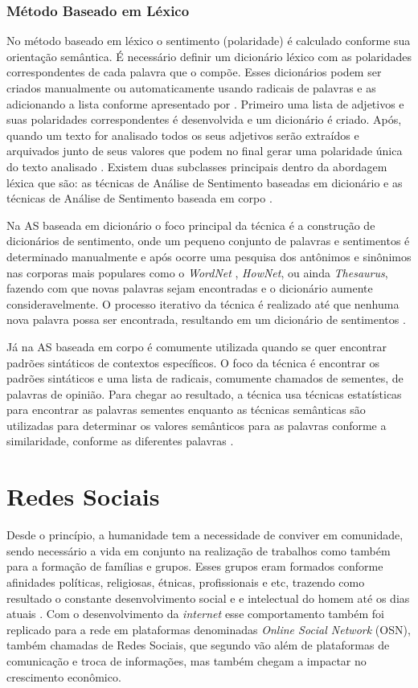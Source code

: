 \subsubsection{Método Baseado em Léxico}
\label{subsubsec:lexico}
No método baseado em léxico o sentimento (polaridade) é calculado conforme sua orientação semântica. É necessário definir um dicionário léxico com as polaridades correspondentes de cada palavra que o compõe. Esses dicionários podem ser criados manualmente ou automaticamente usando radicais de palavras e as adicionando a lista conforme apresentado por . Primeiro uma lista de adjetivos e suas polaridades correspondentes é desenvolvida e um dicionário é criado. Após, quando um texto for analisado todos os seus adjetivos serão extraídos e arquivados junto de seus valores que podem no final gerar uma polaridade única do texto analisado \cite{Taboada}. Existem duas subclasses principais dentro da abordagem léxica que são: as técnicas de Análise de Sentimento baseadas em dicionário e as técnicas de Análise de Sentimento baseada em corpo \cite{LIU2017149}.

Na AS baseada em dicionário o foco principal da técnica é a construção de dicionários de sentimento, onde um pequeno conjunto de palavras e sentimentos é determinado manualmente e após ocorre uma pesquisa dos antônimos e sinônimos nas corporas mais populares como o \textit{WordNet} \cite{Miller:1995:WLD:219717.219748}, \textit{HowNet}, ou ainda \textit{Thesaurus}, fazendo com que novas palavras sejam encontradas e o dicionário aumente consideravelmente. O processo iterativo da técnica é realizado até que nenhuma nova palavra possa ser encontrada, resultando em um dicionário de sentimentos \cite{LIU2017149}. 

Já na AS baseada em corpo é comumente utilizada quando se quer encontrar padrões sintáticos de contextos específicos. O foco da técnica é encontrar os padrões sintáticos e uma lista de radicais, comumente chamados de sementes, de palavras de opinião. Para chegar ao resultado, a técnica usa técnicas estatísticas para encontrar as palavras sementes enquanto as técnicas semânticas são utilizadas para determinar os valores semânticos para as palavras conforme a similaridade, conforme as diferentes palavras \cite{LIU2017149}.

\section{Redes Sociais}
\label{sec:RedesSociais}
Desde o princípio, a humanidade tem a necessidade de conviver em comunidade, sendo necessário a vida em conjunto na realização de trabalhos como também para a formação de famílias e grupos. Esses grupos eram formados conforme afinidades políticas, religiosas, étnicas, profissionais e etc, trazendo como resultado o constante desenvolvimento social e e intelectual do homem até os dias atuais \cite{KHALED2018}. Com o desenvolvimento da \textit{internet} esse comportamento também foi replicado para a rede em plataformas denominadas \textit{Online Social Network} (OSN), também chamadas de Redes Sociais, que segundo  vão além de plataformas de comunicação e troca de informações, mas também chegam a impactar no crescimento econômico. 

